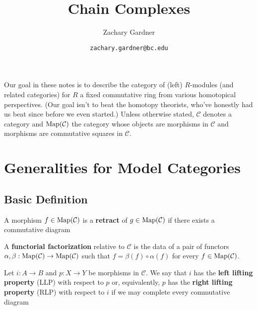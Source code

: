 \documentclass[11pt]{article}
\renewcommand{\C}{\mathcal{C}}
\begin{document}
\title{Chain Complexes}
\author{Zachary Gardner}
\date{\texttt{zachary.gardner@bc.edu}}
\maketitle

Our goal in these notes is to describe the category of (left) $R$-modules (and related categories) for $R$ a fixed commutative ring from various homotopical perspectives. (Our goal isn't to beat the homotopy theorists, who've honestly had us beat since before we even started.) Unless otherwise stated, $\C$ denotes a category and $\Map(\C)$ the category whose objects are morphisms in $\C$ and morphisms are commutative squares in $\C$.

\section{Generalities for Model Categories}
\subsection{Basic Definition}
\begin{definition}
A morphism $f\in\Map(\C)$ is a \textbf{retract} of $g\in\Map(\C)$ if there exists a commutative diagram
\begin{center}
\end{center}
A \textbf{functorial factorization} relative to $\C$ is the data of a pair of functors $\alpha,\beta: \Map(\C)\to\Map(\C)$ such that $f=\beta(f)\circ\alpha(f)$ for every $f\in\Map(\C)$.
\end{definition}

\begin{definition}
Let $i: A\to B$ and $p: X\to Y$ be morphisms in $\C$. We say that $i$ has the \textbf{left lifting property} (LLP) with respect to $p$ or, equivalently, $p$ has the \textbf{right lifting property} (RLP) with respect to $i$ if we may complete every commutative diagram
\begin{center}
\end{center}
\end{definition}
\end{document}
